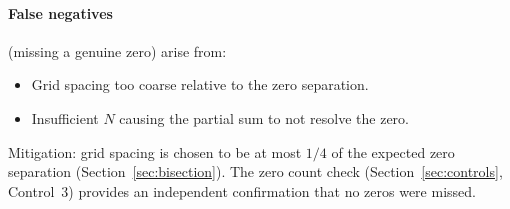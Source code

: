 \paragraph{False negatives} (missing a genuine zero) arise from:
\begin{itemize}
  \item Grid spacing too coarse relative to the zero separation.
  \item Insufficient $N$ causing the partial sum to not resolve the zero.
\end{itemize}
Mitigation: grid spacing is chosen to be at most $1/4$ of the expected zero separation
(Section~\ref{sec:bisection}). The zero count check (Section~\ref{sec:controls},
Control~3) provides an independent confirmation that no zeros were missed.
